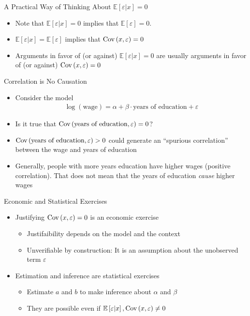 \documentclass[static]{JJH-Beamer}
\begin{document}
\begin{frame}{A Practical Way of Thinking About $\mathbb{E} \left[ \varepsilon | x \right] = 0$}
		\begin{itemize}
			\item Note that $\mathbb{E} \left[ \varepsilon | x \right] = 0$ implies that $\mathbb{E} \left[ \varepsilon \right] = 0$. 
			\item  $\mathbb{E} \left[ \varepsilon | x \right] = \mathbb{E} \left[ \varepsilon \right]$  implies that $\operatorname{Cov} \left( x, \varepsilon \right) = 0$ 
			\bigskip
			\item Arguments in favor of (or against) $\mathbb{E} \left[ \varepsilon | x \right] = 0$ are usually arguments in favor of (or against) $\operatorname{Cov} \left( x, \varepsilon \right) = 0$
		\end{itemize}
\end{frame}

\begin{frame}{Correlation is No Causation}
		\begin{itemize}
			\item Consider the model 
			\begin{align}
			\log (\text{wage}) = \alpha + \beta \cdot \text{years of education} + \varepsilon \nonumber
			\end{align}
		\item Is it true that $\operatorname{Cov} \left( \text{years of education}, \varepsilon \right) = 0$? 
		\item $\operatorname{Cov} \left( \text{years of education}, \varepsilon \right) > 0$ could generate an ``spurious correlation'' between the wage and years of education
		\bigskip
		\item Generally, people with more years education have higher wages (positive correlation). That does not mean that the years of education \textit{cause} higher wages 
		\end{itemize}	
\end{frame}

\begin{frame}{Economic and Statistical Exercises}
	\begin{itemize}
	\item Justifying $\operatorname{Cov} \left( x, \varepsilon \right) = 0$ is an economic exercise
		\begin{itemize}
			\item Justifaibility depends on the model and the context
			\item Unverifiable by construction: It is an assumption about the unobserved term $\varepsilon$
		\end{itemize}
	\bigskip
	\item Estimation and inference are statistical exercises 
		\begin{itemize}
			\item Estimate $a$ and $b$ to make inference about $\alpha$ and $\beta$ 	
			\item They are possible even if $\mathbb{E} \left[ \varepsilon | x \right], \operatorname{Cov} \left( x, \varepsilon \right) \neq 0$
		\end{itemize}
	\end{itemize}
\end{frame}
\end{document}
